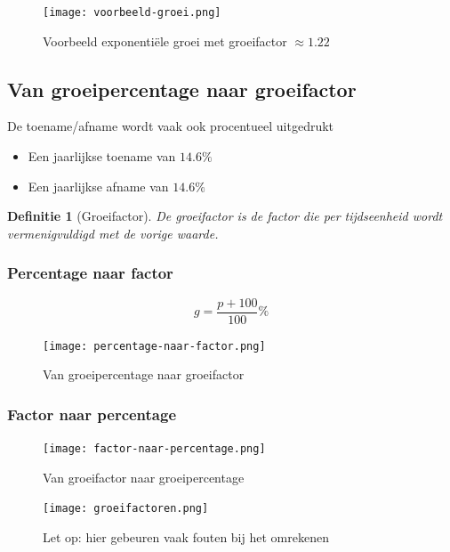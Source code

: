 \documentclass{article}
\newtheorem{theorem}{Definitie}[section]
\begin{document}
\begin{figure}[H]
    \centering
    \texttt{[image: voorbeeld-groei.png]}
    \caption{Voorbeeld exponentiële groei met groeifactor $\approx 1.22$}
\end{figure}


\subsection{Van groeipercentage naar groeifactor}

De toename/afname wordt vaak ook procentueel uitgedrukt

\begin{itemize}
    \item Een jaarlijkse toename van $14.6\%$
    \item Een jaarlijkse afname van $14.6\%$
\end{itemize}

\begin{theorem}[Groeifactor]
De groeifactor is de factor die per tijdseenheid wordt vermenigvuldigd met de vorige waarde.
\end{theorem}

\subsubsection{Percentage naar factor}

\begin{equation}
g = \frac{p + 100}{100}\%
\end{equation} 

\begin{figure}[H]
    \centering
    \texttt{[image: percentage-naar-factor.png]}
    \caption{Van groeipercentage naar groeifactor}
\end{figure}


\subsubsection{Factor naar percentage}

\begin{figure}[H]
    \centering
    \texttt{[image: factor-naar-percentage.png]}
    \caption{Van groeifactor naar groeipercentage}
\end{figure}

\begin{figure}[H]
    \centering
    \texttt{[image: groeifactoren.png]}
    \caption{Let op: hier gebeuren vaak fouten bij het omrekenen}
\end{figure}
\end{document}
